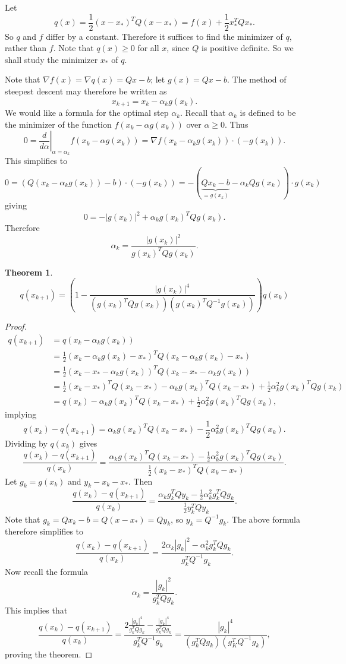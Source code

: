 \documentclass[11pt]{article}
\newtheorem{theorem}{Theorem}[subsection]
\begin{document}
Let 
\[
q(x) = \frac{1}{2}(x - x_*)^TQ(x-x_*) = f(x) + \frac{1}{2}x_*^TQx_*.
\]
So $q$ and $f$ differ by a constant. Therefore it suffices to find the minimizer of $q$, rather than $f$. Note that $q(x) \geq 0$ for all $x$, since $Q$ is positive definite. So we shall study the minimizer $x_*$ of $q$.

Note that $\nabla f(x) = \nabla q(x) = Qx - b$; let $g(x) = Qx - b$. The method of steepest descent may therefore be written as
\[
x_{k+1} = x_k - \alpha_k g(x_k).
\]
We would like a formula for the optimal step $\alpha_k$. Recall that $\alpha_k$ is defined to be the minimizer of the function $f(x_k - \alpha g(x_k))$ over $\alpha \geq 0$. Thus
\[
0 = \left. \frac{d}{d\alpha} \right|_{\alpha = \alpha_k} f(x_k - \alpha g(x_k)) = \nabla f(x_k - \alpha_k g(x_k)) \cdot (-g(x_k)).
\]
This simplifies to
\[
0 = (Q(x_k - \alpha_k g(x_k)) - b) \cdot (-g(x_k)) = -(\underbrace{Qx_k - b}_{=g(x_k)} - \alpha_k Q g(x_k)) \cdot g(x_k)
\]
giving
\[
0 = -|g(x_k)|^2 + \alpha_k g(x_k)^TQg(x_k).
\]
Therefore
\[
\tag{*}
\alpha_k = \frac{|g(x_k)|^2}{g(x_k)^TQg(x_k)}.
\]
\begin{theorem}
\[
q(x_{k+1}) = \left( 1 - \frac{|g(x_k)|^4}{(g(x_k)^T Q g(x_k))(g(x_k)^TQ^{-1}g(x_k))} \right)q(x_k)
\]
\end{theorem}
\begin{proof}
\begin{align*}
q(x_{k+1}) &= q(x_k - \alpha_k g(x_k)) \\
&= \frac{1}{2}(x_k - \alpha_k g(x_k) - x_*)^T Q (x_k - \alpha_k g(x_k) - x_*) \\
&= \frac{1}{2}(x_k - x_* - \alpha_k g(x_k))^T Q (x_k - x_* - \alpha_k g(x_k)) \\
&= \frac{1}{2}(x_k - x_*)^T Q (x_k - x_*) - \alpha_k g(x_k)^TQ(x_k - x_*) + \frac{1}{2} \alpha_k^2 g(x_k)^T Q g(x_k) \\
&= q(x_k) - \alpha_k g(x_k)^TQ(x_k - x_*) + \frac{1}{2} \alpha_k^2 g(x_k)^T Q g(x_k),
\end{align*}
implying
\[
q(x_k) - q(x_{k+1}) = \alpha_k g(x_k)^TQ(x_k - x_*) - \frac{1}{2} \alpha_k^2 g(x_k)^T Q g(x_k).
\]
Dividing by $q(x_k)$ gives
\[
\frac{q(x_k) - q(x_{k+1})}{q(x_k)} = \frac{\alpha_k g(x_k)^TQ(x_k - x_*) - \frac{1}{2} \alpha_k^2 g(x_k)^T Q g(x_k)}{\frac{1}{2}(x_k - x_*)^T Q (x_k - x_*)}.
\]
Let $g_k = g(x_k)$ and $y_k - x_k - x_*$. Then
\[
\frac{q(x_k) - q(x_{k+1})}{q(x_k)} = \frac{\alpha_k g_k^T Q y_k - \frac{1}{2} \alpha_k^2 g_k^T Q g_k}{\frac{1}{2} y_k^T Q y_k}.
\]
Note that $g_k = Qx_k - b = Q(x - x_*) = Qy_k$, so $y_k = Q^{-1}g_k$. The above formula therefore simplifies to
\[
\frac{q(x_k) - q(x_{k+1})}{q(x_k)} = \frac{2 \alpha_k |g_k|^2 - \alpha_k^2 g_k^TQg_k}{g_k^T Q^{-1} g_k}.
\]
Now recall the formula
\[
\tag{*}
\alpha_k = \frac{|g_k|^2}{g_k^TQg_k}.
\]
This implies that
\[
\frac{q(x_k) - q(x_{k+1})}{q(x_k)} = \frac{2 \frac{|g_k|^4}{g_k^T Q g_k} - \frac{|g_k|^4}{g_k^T Q g_k}}{g_k^T Q^{-1}g_k} = \frac{|g_k|^4}{(g_k^T Q g_k)(g_K^T Q^{-1} g_k)},
\]
proving the theorem.
\end{proof}
\end{document}
